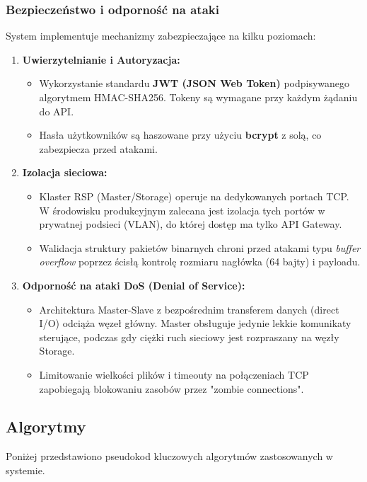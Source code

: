 \documentclass[12pt,a4paper]{article}
\begin{document}
	\newpage
	
	\subsubsection{Bezpieczeństwo i odporność na ataki}
	System implementuje mechanizmy zabezpieczające na kilku poziomach:
	
	\begin{enumerate}
		\item \textbf{Uwierzytelnianie i Autoryzacja:}
		\begin{itemize}
			\item Wykorzystanie standardu \textbf{JWT (JSON Web Token)} podpisywanego algorytmem HMAC-SHA256. Tokeny są wymagane przy każdym żądaniu do API.
			\item Hasła użytkowników są haszowane przy użyciu \textbf{bcrypt} z solą, co zabezpiecza przed atakami.
		\end{itemize}
		
		\item \textbf{Izolacja sieciowa:}
		\begin{itemize}
			\item Klaster RSP (Master/Storage) operuje na dedykowanych portach TCP. W środowisku produkcyjnym zalecana jest izolacja tych portów w prywatnej podsieci (VLAN), do której dostęp ma tylko API Gateway.
			\item Walidacja struktury pakietów binarnych chroni przed atakami typu \textit{buffer overflow} poprzez ścisłą kontrolę rozmiaru nagłówka (64 bajty) i payloadu.
		\end{itemize}
		
		\item \textbf{Odporność na ataki DoS (Denial of Service):}
		\begin{itemize}
			\item Architektura Master-Slave z bezpośrednim transferem danych (direct I/O) odciąża węzeł główny. Master obsługuje jedynie lekkie komunikaty sterujące, podczas gdy ciężki ruch sieciowy jest rozpraszany na węzły Storage.
			\item Limitowanie wielkości plików i timeouty na połączeniach TCP zapobiegają blokowaniu zasobów przez "zombie connections".
		\end{itemize}
	\end{enumerate}

	\subsection{Algorytmy}
Poniżej przedstawiono pseudokod kluczowych algorytmów zastosowanych w systemie.
\end{document}
